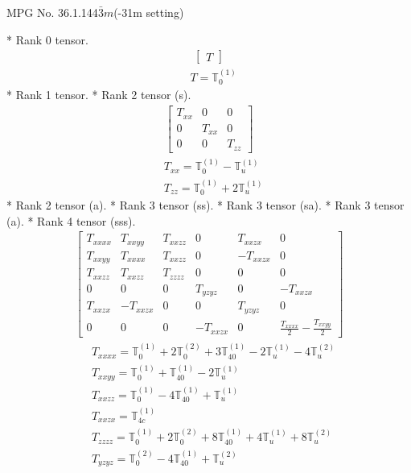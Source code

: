 \documentclass[fleqn,8pt,landscape]{jsarticle}
\begin{document}
\setcounter{MaxMatrixCols}{32}

\renewcommand{\tablename}{Table~}
\renewcommand{\figurename}{Figure~}
\begin{center}
\LARGE
MPG No. 36.1.144\quad$\bar{3}m$\quad(-31m setting)
\end{center}
* Rank 0 tensor.
\begin{align*}
\begin{bmatrix} T \end{bmatrix}
\end{align*}
\begin{align*}
& T = \mathbb{T}_{0}^{(1)}
\end{align*}
* Rank 1 tensor.
* Rank 2 tensor (s).
\begin{align*}
\begin{bmatrix} T_{xx} & 0 & 0 \\ 0 & T_{xx} & 0 \\ 0 & 0 & T_{zz} \end{bmatrix}
\end{align*}
\begin{align*}
& T_{xx} = \mathbb{T}_{0}^{(1)} - \mathbb{T}_{u}^{(1)} \\
& T_{zz} = \mathbb{T}_{0}^{(1)} + 2 \mathbb{T}_{u}^{(1)}
\end{align*}
* Rank 2 tensor (a).
* Rank 3 tensor (ss).
* Rank 3 tensor (sa).
* Rank 3 tensor (a).
* Rank 4 tensor (sss).
\begin{align*}
\begin{bmatrix} T_{xxxx} & T_{xxyy} & T_{xxzz} & 0 & T_{xxzx} & 0 \\ T_{xxyy} & T_{xxxx} & T_{xxzz} & 0 & - T_{xxzx} & 0 \\ T_{xxzz} & T_{xxzz} & T_{zzzz} & 0 & 0 & 0 \\ 0 & 0 & 0 & T_{yzyz} & 0 & - T_{xxzx} \\ T_{xxzx} & - T_{xxzx} & 0 & 0 & T_{yzyz} & 0 \\ 0 & 0 & 0 & - T_{xxzx} & 0 & \frac{T_{xxxx}}{2} - \frac{T_{xxyy}}{2} \end{bmatrix}
\end{align*}
\begin{align*}
& T_{xxxx} = \mathbb{T}_{0}^{(1)} + 2 \mathbb{T}_{0}^{(2)} + 3 \mathbb{T}_{40}^{(1)} - 2 \mathbb{T}_{u}^{(1)} - 4 \mathbb{T}_{u}^{(2)} \\
& T_{xxyy} = \mathbb{T}_{0}^{(1)} + \mathbb{T}_{40}^{(1)} - 2 \mathbb{T}_{u}^{(1)} \\
& T_{xxzz} = \mathbb{T}_{0}^{(1)} - 4 \mathbb{T}_{40}^{(1)} + \mathbb{T}_{u}^{(1)} \\
& T_{xxzx} = \mathbb{T}_{4c}^{(1)} \\
& T_{zzzz} = \mathbb{T}_{0}^{(1)} + 2 \mathbb{T}_{0}^{(2)} + 8 \mathbb{T}_{40}^{(1)} + 4 \mathbb{T}_{u}^{(1)} + 8 \mathbb{T}_{u}^{(2)} \\
& T_{yzyz} = \mathbb{T}_{0}^{(2)} - 4 \mathbb{T}_{40}^{(1)} + \mathbb{T}_{u}^{(2)}
\end{align*}
\end{document}
